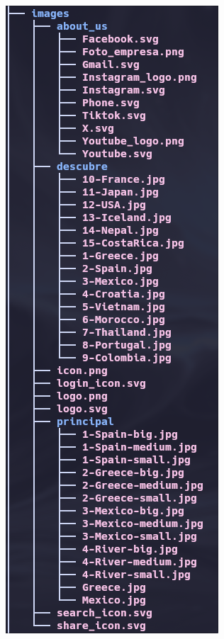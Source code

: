 \documentclass[11pt, a4paper]{book}
\begin{document}
\begin{figure} [h]
\begin{minipage}[c]{0.25\textwidth}
		\end{minipage}
		\begin{minipage}[c]{0.25\textwidth}
			\centering
			\includegraphics[width=\textwidth]{estructura_ficheros_final2.png}

\end{minipage}
\end{figure}
\end{document}
